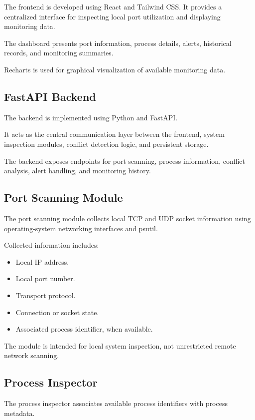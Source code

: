 \documentclass[conference]{IEEEtran}
\begin{document}
The frontend is developed using React and Tailwind CSS.
It provides a centralized interface for inspecting
local port utilization and displaying monitoring data.

The dashboard presents port information, process
details, alerts, historical records, and monitoring
summaries.

Recharts is used for graphical visualization of
available monitoring data.

\subsection{FastAPI Backend}

The backend is implemented using Python and FastAPI.

It acts as the central communication layer between
the frontend, system inspection modules, conflict
detection logic, and persistent storage.

The backend exposes endpoints for port scanning,
process information, conflict analysis, alert handling,
and monitoring history.

\subsection{Port Scanning Module}

The port scanning module collects local TCP and UDP
socket information using operating-system networking
interfaces and psutil.

Collected information includes:

\begin{itemize}
    \item Local IP address.
    \item Local port number.
    \item Transport protocol.
    \item Connection or socket state.
    \item Associated process identifier, when available.
\end{itemize}

The module is intended for local system inspection,
not unrestricted remote network scanning.

\subsection{Process Inspector}

The process inspector associates available process
identifiers with process metadata.
\end{document}
